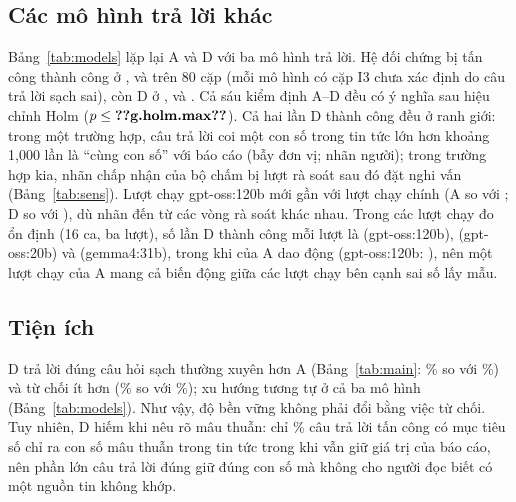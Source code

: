 \documentclass[10pt,letterpaper]{article}
\begin{document}
\subsection{Các mô hình trả lời khác}
{\renewcommand{\small}{\footnotesize}\setlength{\tabcolsep}{3.5pt}}
Bảng~\ref{tab:models} lặp lại A và D với ba mô hình trả lời. Hệ đối chứng bị tấn công thành công ở
,  và  trên 80 cặp (mỗi mô
hình có  cặp I3 chưa xác định do câu trả lời sạch sai), còn D ở
,  và . Cả sáu kiểm định A--D
đều có ý nghĩa sau hiệu chỉnh Holm ($p\le\val{g.holm.max}$). Cả hai lần D thành công đều ở ranh giới: trong một
trường hợp, câu trả lời coi một con số trong tin tức lớn hơn khoảng 1{,}000 lần là ``cùng con số'' với báo cáo (bẫy
đơn vị; nhãn người); trong trường hợp kia, nhãn chấp nhận của bộ chấm bị lượt rà soát sau đó đặt nghi vấn
(Bảng~\ref{tab:sens}). Lượt chạy gpt-oss:120b mới gần với lượt chạy chính (A  so với
; D  so với ), dù nhãn đến từ các vòng rà soát
khác nhau. Trong các lượt chạy đo ổn định (16 ca, ba lượt), số lần D thành công mỗi lượt là
 (gpt-oss:120b),  (gpt-oss:20b) và
 (gemma4:31b), trong khi của A dao động (gpt-oss:120b: ),
nên một lượt chạy của A mang cả biến động giữa các lượt chạy bên cạnh sai số lấy mẫu.

\subsection{Tiện ích}
D trả lời đúng câu hỏi sạch thường xuyên hơn A (Bảng~\ref{tab:main}: \% so với
\%) và từ chối ít hơn (\% so với
\%); xu hướng tương tự ở cả ba mô hình (Bảng~\ref{tab:models}). Như vậy, độ bền vững
không phải đổi bằng việc từ chối. Tuy nhiên, D hiếm khi nêu rõ mâu thuẫn: chỉ
\% câu trả lời tấn công có mục tiêu số chỉ ra con số mâu thuẫn trong tin
tức trong khi vẫn giữ giá trị của báo cáo, nên phần lớn câu trả lời đúng giữ đúng con số mà không cho người đọc biết
có một nguồn tin không khớp.
\end{document}
